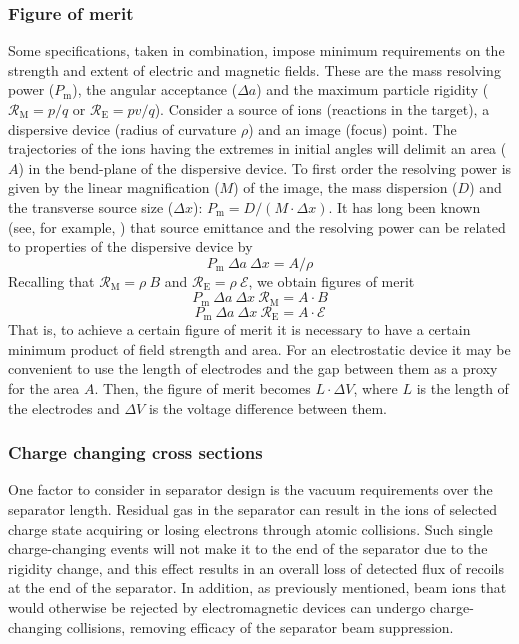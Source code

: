   \subsubsection{Figure of merit}
  Some specifications, taken in combination, impose minimum requirements on the strength and extent of electric and magnetic fields.   These are the mass resolving power ($P_\mathrm{m}$), the angular acceptance ($\Delta a$) and the maximum particle rigidity 
  ($\mathcal{R}_\mathrm{M}=p/q$ or $\mathcal{R}_\mathrm{E}=pv/q$).    
  Consider a source of ions (reactions in the target), a dispersive device  (radius of curvature $\rho$) and an image (focus) point.   The  trajectories of the ions having the extremes in initial angles will delimit an area ($A$)  in the bend-plane of the dispersive device.     To first order the resolving power is given by the linear magnification ($M$) of the image, the mass dispersion ($D$) and the transverse source size ($\Delta x$): 
  $P_\mathrm{m} = D/(M \cdot \Delta x) $. 
  It has long been known (see, for example, \cite{Wo71}) that source emittance and the resolving power can be related to properties of the dispersive device by
  \[ P_\mathrm{m}\  \Delta a\  \Delta x = A/\rho \]
  Recalling that 
  $\mathcal{R}_\mathrm{M}=\rho \ B$ and $\mathcal{R}_\mathrm{E}=\rho \ \mathcal{E}$,  we obtain  figures of merit 
  \[ P_\mathrm{m}\  \Delta a\  \Delta x \ \mathcal{R}_\mathrm{M} = A \cdot B \]
   \[P_\mathrm{m}\  \Delta a\  \Delta x \ \mathcal{R}_\mathrm{E} = A \cdot \mathcal{E} \]
   That is, to achieve a certain figure of merit it is necessary to have a certain minimum product of field strength and area.  For an electrostatic device it may be convenient to use the length of electrodes and the gap between them as a proxy for the area $A$.  Then, the figure of merit becomes $L\cdot\Delta V$, where $L$ is the length of the electrodes and $\Delta V$ is the voltage difference between them.
   
\subsubsection{Charge changing cross sections}
One factor to consider in separator design is the vacuum requirements over the separator length. Residual gas in the separator can result in the ions of selected charge state acquiring or losing electrons through atomic collisions. Such single charge-changing events will not make it to the end of the separator due to the rigidity change, and this effect results in an overall loss of detected flux of recoils at the end of the separator.  In addition, as previously mentioned, beam ions that would otherwise be rejected by electromagnetic devices can undergo charge-changing collisions, removing efficacy of the separator beam suppression.

